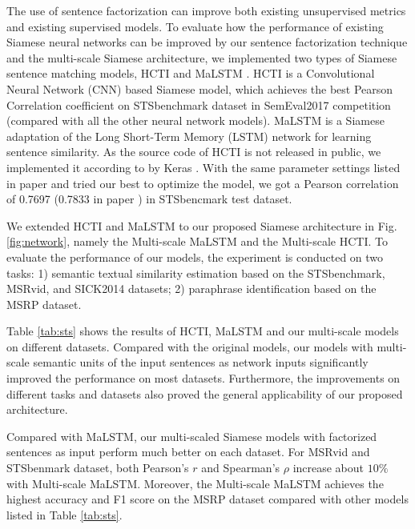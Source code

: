 The use of sentence factorization can improve both existing unsupervised metrics and existing supervised models. 
To evaluate how the performance of existing Siamese neural networks can be improved by our sentence factorization technique and the multi-scale Siamese architecture, we implemented two types of Siamese sentence matching models, HCTI \cite{mueller2016siamese} and MaLSTM \cite{shao2017hcti}. HCTI is a Convolutional Neural Network (CNN) based Siamese model, which achieves the best Pearson Correlation coefficient on STSbenchmark dataset in SemEval2017 competition (compared with all the other neural network models). MaLSTM is a Siamese adaptation of the Long Short-Term Memory (LSTM) network for learning sentence similarity. As the source code of HCTI is not released in public, we implemented it according to \cite{shao2017hcti} by Keras \cite{chollet2015keras}. With the same parameter settings listed in paper \cite{shao2017hcti} and tried our best to optimize the model, we got a Pearson correlation of 0.7697 (0.7833 in paper \cite{shao2017hcti}) in STSbencmark test dataset.

We extended HCTI and MaLSTM to our proposed Siamese architecture in Fig. \ref{fig:network}, namely the Multi-scale MaLSTM and the Multi-scale HCTI. To evaluate the performance of our models, the experiment is conducted on two tasks: 1) semantic textual similarity estimation based on the STSbenchmark, MSRvid, and SICK2014 datasets; 2) paraphrase identification based on the MSRP dataset.

Table \ref{tab:sts} shows the results of HCTI, MaLSTM and our multi-scale models on different datasets. Compared with the original models, our models with multi-scale semantic units of the input sentences as network inputs significantly improved the performance on most datasets. 
Furthermore, the improvements on different tasks and datasets also proved the general applicability of our proposed architecture.

Compared with MaLSTM, our multi-scaled Siamese models with factorized sentences as input perform much better on each dataset. For MSRvid and STSbenmark dataset, both Pearson's $r$ and Spearman's $\rho$ increase about $10\%$ with Multi-scale MaLSTM. Moreover, the Multi-scale MaLSTM achieves the highest accuracy and F1 score on the MSRP dataset compared with other models listed in Table \ref{tab:sts}.

